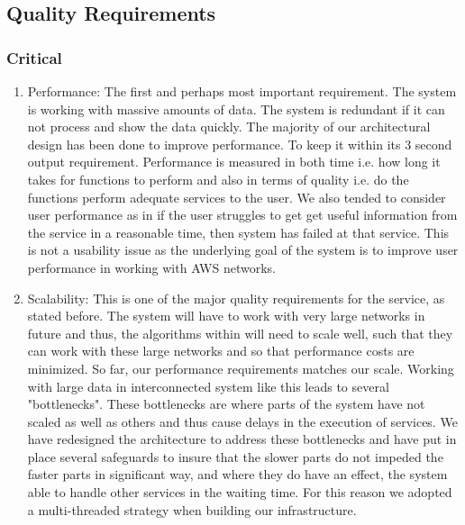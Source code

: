 \documentclass[hidelinks,a4paper,12pt]{article}
\begin{document}
\subsection{Quality Requirements}
\subsubsection {Critical}
\begin{enumerate} 
\item Performance: The first and perhaps most important requirement. The system is working with massive amounts of data. The system is redundant if it can not process and show the data quickly. The majority of our architectural design has been done to improve performance. To keep it within its 3 second output requirement. Performance is measured in both time i.e. how long it takes for functions to perform and also in terms of quality i.e. do the functions perform adequate services to the user. We also tended to consider user performance as in if the user struggles to get get useful information from the service in a reasonable time, then system has failed at that service. This is not a usability issue as the underlying goal of the system is to improve user performance in working with AWS networks.
\item Scalability: This is one of the major quality requirements for the service, as stated before. The system will have to work with very large networks in future and thus, the algorithms within will need to scale well, such that they can work with these large networks and so that performance costs are minimized. So far, our performance requirements matches our scale. Working with large data in interconnected system like this leads to several "bottlenecks". These bottlenecks are where parts of the system have not scaled as well as others and thus cause delays in the execution of services. We have redesigned the architecture to address these bottlenecks and have put in place several safeguards to insure that the slower parts do not impeded the faster parts in significant way, and where they do have an effect, the system able to handle other services in the waiting time. For this reason we adopted a multi-threaded strategy when building our infrastructure.
\end{enumerate} 
\end{document}
